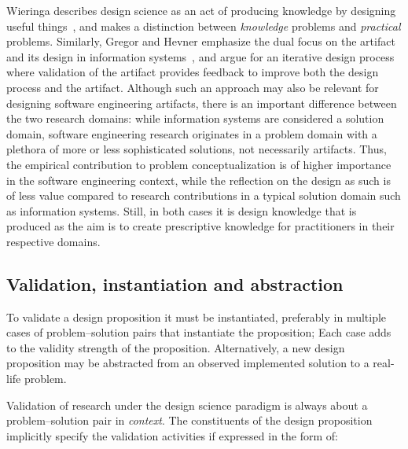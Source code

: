 \documentclass[graybox]{svmult}
\begin{document}


Wieringa describes design science as an act of producing knowledge by designing useful things~\cite{wieringa_design_2009}, and makes a distinction between \emph{knowledge} problems and \emph{practical} problems. Similarly, Gregor and Hevner emphasize the dual focus on the artifact and its design in information systems~\cite{gregor_positioning_2013}, and argue for an iterative design process where validation of the artifact provides feedback to improve both the design process and the artifact. Although such an approach may also be relevant for designing software engineering artifacts, there is an important difference between the two research domains: while information systems are considered a solution domain, software engineering research originates in a problem domain with a plethora of more or less sophisticated solutions, not necessarily artifacts. Thus, the empirical contribution to problem conceptualization is of higher importance in the software engineering context, while the reflection on the design as such is of less value compared to research contributions in a typical solution domain such as information systems. Still, in both cases it is design knowledge that is produced as the aim is to create prescriptive knowledge for practitioners in their respective domains. 

 

\subsection{Validation, instantiation and abstraction}

To validate a design proposition it must be instantiated, preferably in multiple cases of problem--solution pairs that instantiate the proposition; Each case adds to the validity strength of the proposition. Alternatively, a new design proposition may be abstracted from an observed implemented solution to a real-life problem.

Validation of research under the design science paradigm is always about a problem--solution pair in \emph{context}. The constituents of the design proposition implicitly specify the validation activities if expressed in the form of:
\end{document}
